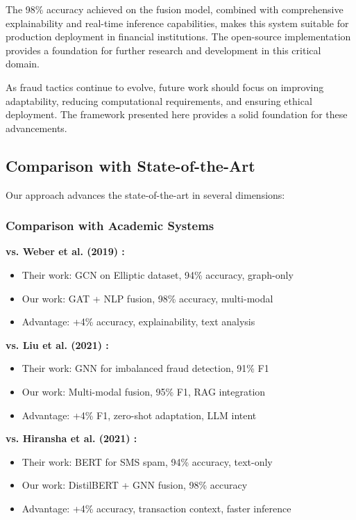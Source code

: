 The 98\% accuracy achieved on the fusion model, combined with comprehensive explainability and real-time inference capabilities, makes this system suitable for production deployment in financial institutions. The open-source implementation provides a foundation for further research and development in this critical domain.

As fraud tactics continue to evolve, future work should focus on improving adaptability, reducing computational requirements, and ensuring ethical deployment. The framework presented here provides a solid foundation for these advancements.

\subsection{Comparison with State-of-the-Art}

Our approach advances the state-of-the-art in several dimensions:

\subsubsection{Comparison with Academic Systems}

\textbf{vs. Weber et al. (2019) \cite{weber2019anti}:}
\begin{itemize}
    \item Their work: GCN on Elliptic dataset, 94\% accuracy, graph-only
    \item Our work: GAT + NLP fusion, 98\% accuracy, multi-modal
    \item Advantage: +4\% accuracy, explainability, text analysis
\end{itemize}

\textbf{vs. Liu et al. (2021) \cite{liu2021pick}:}
\begin{itemize}
    \item Their work: GNN for imbalanced fraud detection, 91\% F1
    \item Our work: Multi-modal fusion, 95\% F1, RAG integration
    \item Advantage: +4\% F1, zero-shot adaptation, LLM intent
\end{itemize}

\textbf{vs. Hiransha et al. (2021) \cite{hiransha2021deep}:}
\begin{itemize}
    \item Their work: BERT for SMS spam, 94\% accuracy, text-only
    \item Our work: DistilBERT + GNN fusion, 98\% accuracy
    \item Advantage: +4\% accuracy, transaction context, faster inference
\end{itemize}

